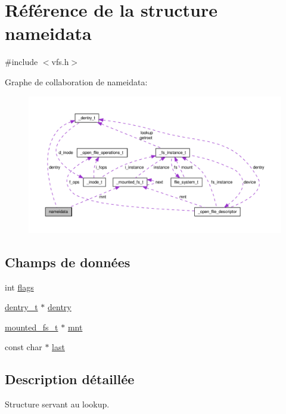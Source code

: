 \hypertarget{structnameidata}{\section{Référence de la structure nameidata}
\label{structnameidata}
}


{\ttfamily \#include $<$vfs.\-h$>$}



Graphe de collaboration de nameidata\-:
\nopagebreak
\begin{figure}[H]
\begin{center}
\leavevmode
\includegraphics[width=350pt]{structnameidata__coll__graph}
\end{center}
\end{figure}
\subsection*{Champs de données}
\begin{DoxyCompactItemize}
\item 
int \hyperlink{structnameidata_a9064ec2b4dd712691e3c7442e48ce798}{flags}
\item 
\hyperlink{vfs_8h_ade5c998c6b3f09d2cf45d0e5ef8787da}{dentry\-\_\-t} $\ast$ \hyperlink{structnameidata_a19b1de01d7a6f689707fa7079cb54d7c}{dentry}
\item 
\hyperlink{vfs_8h_ab4e925860df7937f38b15433bb05225a}{mounted\-\_\-fs\-\_\-t} $\ast$ \hyperlink{structnameidata_a5488ed23ef4b37b431921f71b15e1f19}{mnt}
\item 
const char $\ast$ \hyperlink{structnameidata_a4a11e098a53839c36c2a0a4e732f8037}{last}
\end{DoxyCompactItemize}


\subsection{Description détaillée}
Structure servant au lookup. 

